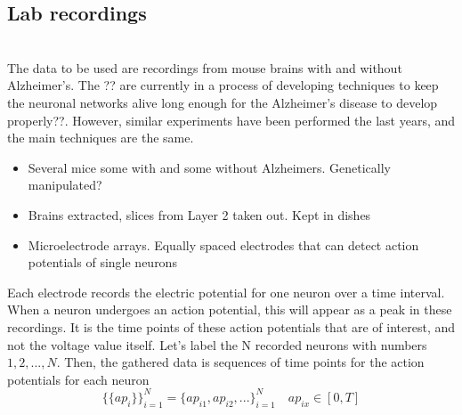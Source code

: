 
\subsection{Lab recordings}

\label{Lab}\\
The data to be used are recordings from mouse brains with and without Alzheimer's. The ?? are currently in a process of developing techniques to keep the neuronal networks alive long enough for the Alzheimer's disease to develop properly??. However, similar experiments have been performed the last years, and the main techniques are the same. 
\begin{itemize}
    \item Several mice some with and some without Alzheimers. Genetically manipulated? 
    \item Brains extracted, slices from Layer 2 taken out. Kept in dishes
    \item Microelectrode arrays. Equally spaced electrodes that can detect action potentials of single neurons
    
\end{itemize}

Each electrode records the electric potential for one neuron over a time interval.  When a neuron undergoes an action potential, this will appear as a peak in these recordings. It is the time points of these action potentials that are of interest, and not the voltage value itself. Let's label the N recorded neurons with numbers $1,2,...,N$. Then, the gathered data is sequences of time points for the action potentials for each neuron
\begin{equation}
    \{\{ap_i\}\}_{i=1}^{N} = \{ap_{i1}, ap_{i2}, ...\}_{i=1}^{N} \quad ap_{ix} \in [0,T]
\end{equation}

